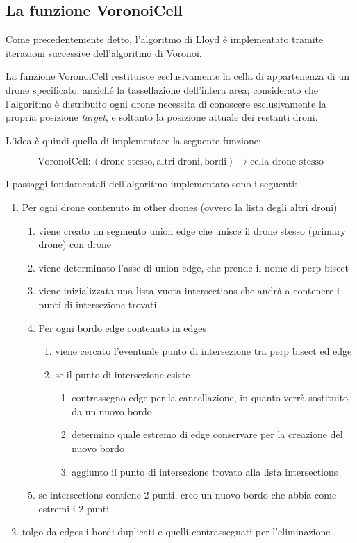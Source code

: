 \documentclass[10pt,a4paper]{article}
\newcommand{\name}[1]{{\color{purple}#1}}
\begin{document}
\subsection{La funzione \name{VoronoiCell}}

Come precedentemente detto, l'algoritmo di Lloyd è implementato tramite iterazioni successive dell'algoritmo di Voronoi.

La funzione \name{VoronoiCell} restituisce esclusivamente la cella di appartenenza di un drone specificato, anziché la tassellazione dell'intera area; considerato che l'algoritmo è distribuito ogni drone necessita di conoscere esclusivamente la propria posizione \textit{target}, e soltanto la posizione attuale dei restanti droni.

L'idea è quindi quella di implementare la seguente funzione:

\[
\text{VoronoiCell} : (\text{drone stesso}, \text{altri droni}, \text{bordi}) \longrightarrow \text{cella drone stesso}
\]

I passaggi fondamentali dell'algoritmo implementato sono i seguenti:


\begin{enumerate}
	\item Per ogni \name{drone} contenuto in \name{other drones} (ovvero la lista degli altri droni)
	\begin{enumerate}
		\item viene creato un segmento \name{union edge} che unisce il drone stesso (\name{primary drone}) con \name{drone}
		\item viene determinato l'asse di \name{union edge}, che prende il nome di \name{perp bisect}
		\item viene inizializzata una lista vuota \name{intersections} che andrà a contenere i punti di intersezione trovati
		\item Per ogni bordo \name{edge} contenuto in \name{edges}
		\begin{enumerate}
			\item viene cercato l'eventuale punto di intersezione tra \name{perp bisect} ed \name{edge}
			\item se il punto di intersezione esiste
			\begin{enumerate}
				\item contrassegno \name{edge} per la cancellazione, in quanto verrà sostituito da un nuovo bordo
				\item determino quale estremo di \name{edge} conservare per la creazione del nuovo bordo
				\item aggiunto il punto di intersezione trovato alla lista \name{intersections}
			\end{enumerate}
		\end{enumerate}
		\item se \name{intersections} contiene 2 punti, creo un nuovo bordo che abbia come estremi i 2 punti
	\end{enumerate}
	\item tolgo da \name{edges} i bordi duplicati e quelli contrassegnati per l'eliminazione
\end{enumerate}
\end{document}
